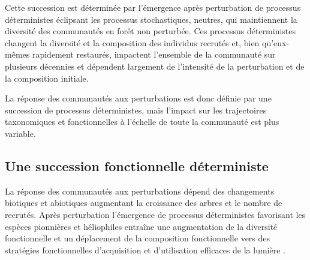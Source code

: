 \documentclass[
  11pt,
  french,
  A4paper,
  extrafontsizes,onecolumn,openright
  ]{memoir}
\begin{document}
Cette succession est déterminée par l'émergence après perturbation de
processus déterministes éclipsant les processus stochastiques, neutres,
qui maintiennent la diversité des communautés en forêt non perturbée.
Ces processus déterministes changent la diversité et la composition des
individus recrutés et, bien qu'eux-mêmes rapidement restaurés, impactent
l'ensemble de la communauté sur plusieurs décennies et dépendent
largement de l'intensité de la perturbation et de la composition
initiale.

La réponse des communautés aux perturbations est donc définie par une
succession de processus déterministes, mais l'impact sur les
trajectoires taxonomiques et fonctionnelles à l'échelle de toute la
communauté est plus variable.

\subsection{Une succession fonctionnelle
déterministe}\label{une-succession-fonctionnelle-deterministe}

La réponse des communautés aux perturbations dépend des changements
biotiques et abiotiques augmentant la croissance des arbres et le nombre
de recrutés. Après perturbation l'émergence de processus déterministes
favorisant les espèces pionnières et héliophiles entraîne une
augmentation de la diversité fonctionnelle et un déplacement de la
composition fonctionnelle vers des stratégies fonctionnelles
d'acquisition et d'utilisation efficaces de la lumière
\autocites{Violle2007b}{Baraloto2012a}.
\end{document}
